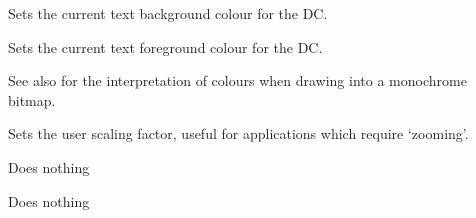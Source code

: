 Sets the current text background colour for the DC.

\label{wxdcsettextforeground}


Sets the current text foreground colour for the DC.

See also  for the interpretation of colours
when drawing into a monochrome bitmap.

\label{wxdcsetuserscale}


Sets the user scaling factor, useful for applications which require
`zooming'.

\label{wxdcstartdoc}


Does nothing

\label{wxdcstartpage}


Does nothing

